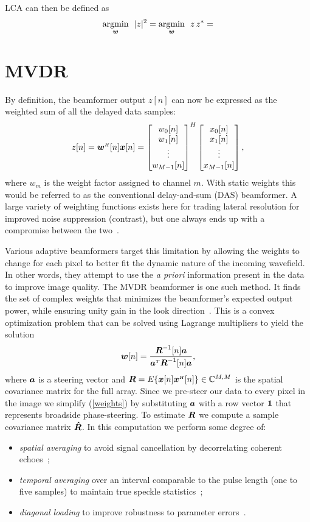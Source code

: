 LCA can then be defined as
%
\begin{align}
\argmin{\w}\ |z|^2 = \argmin{\w}\ z\,z^* = %
\end{align}

\newpage
\section{MVDR}

By definition, the beamformer output $z[n]$ can now be expressed as the weighted sum of all the delayed data samples:
\begin{align}
z[n] = \boldsymbol{w}^{\scriptscriptstyle H}[n]\boldsymbol{x}[n] = \begin{bmatrix}w_0[n]\\w_1[n]\\\vdots\\w_{M-1}[n]\end{bmatrix}^H \begin{bmatrix}x_0[n]\\x_1[n]\\\vdots\\x_{M-1}[n]\end{bmatrix},\label{z}
\end{align}
where $w_m$ is the weight factor assigned to channel $m$. With static weights this would be referred to as the conventional delay-and-sum (DAS) beamformer. A large variety of weighting functions exists here for trading lateral resolution for improved noise suppression (contrast), but one always ends up with a compromise between the two~\cite{Harris1978}.

Various adaptive beamformers target this limitation by allowing the weights to change for each pixel to better fit the dynamic nature of the incoming wavefield. In other words, they attempt to use the \emph{a priori} information present in the data to improve image quality. The MVDR beamformer is one such method. It finds the set of complex weights that minimizes the beamformer's expected output power, while ensuring unity gain in the look direction~\cite{Capon1969}. This is a convex optimization problem that can be solved using Lagrange multipliers to yield the solution
%
\begin{gather}
\boldsymbol{w}[n] = \frac{\boldsymbol{R}^{-1}[n]\boldsymbol{a}}{\boldsymbol{a}^{\scriptscriptstyle T}\boldsymbol{R}^{-1}[n]\boldsymbol{a}},\label{weights}
\end{gather}
%
where $\boldsymbol{a}$ is a steering vector and $\boldsymbol{R}=E\{\boldsymbol{x}[n]\boldsymbol{x}^{\scriptscriptstyle H}[n]\}\in\mathbb{C}^{M,M}$ is the spatial covariance matrix for the full array. Since we pre-steer our data to every pixel in the image we simplify (\ref{weights}) by substituting $\boldsymbol{a}$ with a row vector $\boldsymbol{1}$ that represents broadside phase-steering. To estimate $\boldsymbol{R}$ we compute a sample covariance matrix $\boldsymbol{\hat R}$. In this computation we perform some degree of:
%
\begin{itemize}
\item \emph{spatial averaging} to avoid signal cancellation by decorrelating coherent echoes~\cite{Kailath1985};
\item \emph{temporal averaging} over an interval comparable to the pulse length (one to five samples) to maintain true speckle statistics~\cite{Synnevag2009a};
\item \emph{diagonal loading} to improve robustness to parameter errors~\cite{Cox1987,Maksym1979}.
\end{itemize}%

